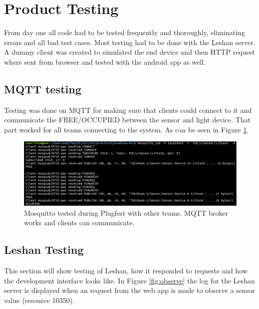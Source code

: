 \section{Product Testing}

From day one all code had to be tested frequently and thoroughly, eliminating errors and all bad test cases. Most testing had to be done with the Leshan server. A dummy client was created to simulated the end device and then HTTP request where sent from browser and tested with the android app as well.

\subsection{MQTT testing}

Testing was done on MQTT for making sure that clients could connect to it and communicate the FREE/OCCUPIED between the sensor and light device. That part worked for all teams connecting to the system. As can be seen in Figure \ref{fig:mqtt3}.
\begin{figure}[h]
	\begin{center}
		\includegraphics[width=\linewidth]{img/mqtt3}
		\caption{Mosquitto tested during Plugfest with other teams. MQTT broker works and clients can communicate.}
		\label{fig:mqtt3}
	\end{center}
\end{figure}

\subsection{Leshan Testing}

This section will show testing of Leshan, how it responded to requests and how the development interface looks like. In Figure \ref{fig:observe} the log for the Leshan server is displayed when an request from the web app is made to observe a sensor value (resource 10350).

